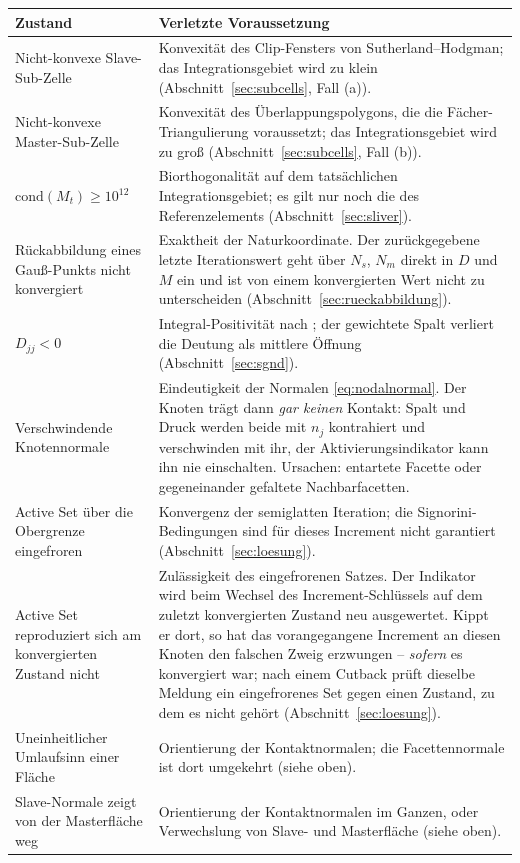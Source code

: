 \documentclass[a4paper,11pt]{article}
\def\bm#1{#1}%
\def\tilde#1{#1}%
\begin{document}
\begin{center}
\small
\begin{tabularx}{\linewidth}{lX}
\toprule
Zustand & Verletzte Voraussetzung \\
\midrule
Nicht-konvexe Slave-Sub-Zelle & Konvexität des Clip-Fensters von Sutherland--Hodgman; das
Integrationsgebiet wird zu klein (Abschnitt~\ref{sec:subcells}, Fall (a)). \\
Nicht-konvexe Master-Sub-Zelle & Konvexität des Überlappungspolygons, die die Fächer-Triangulierung
voraussetzt; das Integrationsgebiet wird zu groß (Abschnitt~\ref{sec:subcells}, Fall (b)). \\
$\mathrm{cond}(\bm M_t)\ge10^{12}$ & Biorthogonalität auf dem tatsächlichen Integrationsgebiet;
es gilt nur noch die des Referenzelements (Abschnitt~\ref{sec:sliver}). \\
Rückabbildung eines Gauß-Punkts nicht konvergiert & Exaktheit der Naturkoordinate. Der zurückgegebene
letzte Iterationswert geht über $\bm N_s$, $\bm N_m$ direkt in $\bm D$ und $\bm M$ ein und ist von
einem konvergierten Wert nicht zu unterscheiden (Abschnitt~\ref{sec:rueckabbildung}). \\
$\tilde D_{jj}<0$ & Integral-Positivität nach \citet[Gl.~(4.2)]{popp2012}; der gewichtete Spalt
verliert die Deutung als mittlere Öffnung (Abschnitt~\ref{sec:sgnd}). \\
Verschwindende Knotennormale & Eindeutigkeit der Normalen \eqref{eq:nodalnormal}. Der Knoten
trägt dann \emph{gar keinen} Kontakt: Spalt und Druck werden beide mit $\bm n_j$ kontrahiert und
verschwinden mit ihr, der Aktivierungsindikator kann ihn nie einschalten. Ursachen: entartete
Facette oder gegeneinander gefaltete Nachbarfacetten. \\
Active Set über die Obergrenze eingefroren & Konvergenz der semiglatten Iteration; die
Signorini-Bedingungen sind für dieses Increment nicht garantiert
(Abschnitt~\ref{sec:loesung}). \\
Active Set reproduziert sich am konvergierten Zustand nicht & Zulässigkeit des eingefrorenen
Satzes. Der Indikator wird beim Wechsel des Increment-Schlüssels auf dem zuletzt konvergierten
Zustand neu ausgewertet. Kippt er dort, so hat das vorangegangene Increment an diesen Knoten den
falschen Zweig erzwungen -- \emph{sofern} es konvergiert war; nach einem Cutback prüft dieselbe
Meldung ein eingefrorenes Set gegen einen Zustand, zu dem es nicht gehört
(Abschnitt~\ref{sec:loesung}). \\
Uneinheitlicher Umlaufsinn einer Fläche & Orientierung der Kontaktnormalen; die Facettennormale
ist dort umgekehrt (siehe oben). \\
Slave-Normale zeigt von der Masterfläche weg & Orientierung der Kontaktnormalen im Ganzen, oder
Verwechslung von Slave- und Masterfläche (siehe oben). \\
\bottomrule
\end{tabularx}
\end{center}
\end{document}

